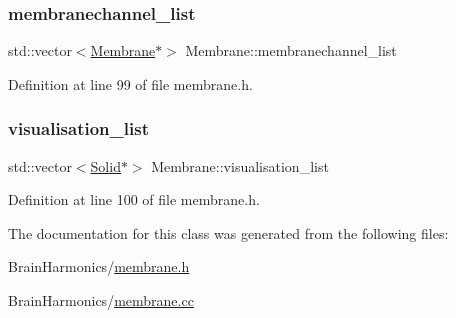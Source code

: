\subsubsection{\texorpdfstring{membranechannel\+\_\+list}{membranechannel\_list}}
{\footnotesize\ttfamily std\+::vector$<$\mbox{\hyperlink{class_membrane}{Membrane}}$\ast$$>$ Membrane\+::membranechannel\+\_\+list\hspace{0.3cm}{\ttfamily [protected]}}



Definition at line 99 of file membrane.\+h.

\mbox{\label{class_membrane_a926d35c07f664b60deb6e9f87649fe89}} 
\subsubsection{\texorpdfstring{visualisation\+\_\+list}{visualisation\_list}}
{\footnotesize\ttfamily std\+::vector$<$\mbox{\hyperlink{class_solid}{Solid}}$\ast$$>$ Membrane\+::visualisation\+\_\+list\hspace{0.3cm}{\ttfamily [protected]}}



Definition at line 100 of file membrane.\+h.



The documentation for this class was generated from the following files\+:\begin{DoxyCompactItemize}
\item 
Brain\+Harmonics/\mbox{\hyperlink{membrane_8h}{membrane.\+h}}\item 
Brain\+Harmonics/\mbox{\hyperlink{membrane_8cc}{membrane.\+cc}}\end{DoxyCompactItemize}
